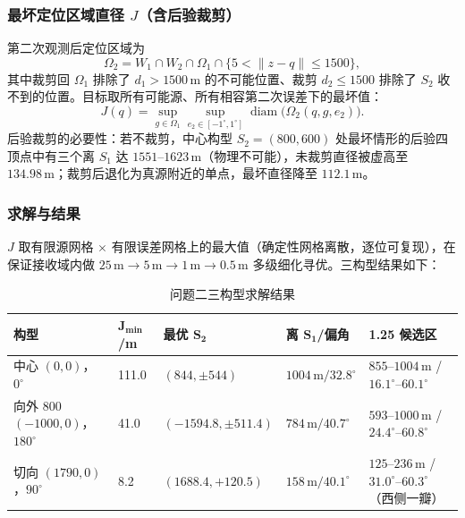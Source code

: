 \documentclass[12pt,a4paper]{article}
\begin{document}
\subsubsection{最坏定位区域直径 $J$（含后验裁剪）}
第二次观测后定位区域为
\begin{equation}
\Omega_2=W_1\cap W_2\cap\Omega_1\cap\{5<\lVert z-q\rVert\le 1500\},
\end{equation}
其中裁剪回 $\Omega_1$ 排除了 $d_1>1500\,\mathrm{m}$ 的不可能位置、裁剪 $d_2\le 1500$ 排除了 $S_2$ 收不到的位置。目标取所有可能源、所有相容第二次误差下的最坏值：
\begin{equation}
J(q)=\sup_{g\in\Omega_1}\sup_{e_2\in[-1^{\circ},1^{\circ}]}\operatorname{diam}\bigl(\Omega_2(q,g,e_2)\bigr).
\end{equation}
后验裁剪的必要性：若不裁剪，中心构型 $S_2=(800,600)$ 处最坏情形的后验四顶点中有三个离 $S_1$ 达 $1551$--$1623\,\mathrm{m}$（物理不可能），未裁剪直径被虚高至 $134.98\,\mathrm{m}$；裁剪后退化为真源附近的单点，最坏直径降至 $112.1\,\mathrm{m}$。

\subsubsection{求解与结果}
$J$ 取有限源网格 $\times$ 有限误差网格上的最大值（确定性网格离散，逐位可复现），在保证接收域内做 $25\,\mathrm{m}\to 5\,\mathrm{m}\to 1\,\mathrm{m}\to 0.5\,\mathrm{m}$ 多级细化寻优。三构型结果如下：

\begin{table}[H]
\centering
\caption{问题二三构型求解结果}
\small
\begin{tabularx}{\textwidth}{@{}L{3.15cm}L{1.35cm}L{3.15cm}L{2.55cm}Y@{}}
\toprule
\textbf{构型} & $\boldsymbol{J_{\min}}$\textbf{/m} & \textbf{最优} $\boldsymbol{S_2}$ & \textbf{离} $\boldsymbol{S_1}$\textbf{/偏角} & \textbf{1.25 候选区} \\
\midrule
中心 $(0,0)$，$0^{\circ}$
  & 111.0 & $(844,\pm 544)$ & $1004\,\mathrm{m}/32.8^{\circ}$
  & $855$--$1004\,\mathrm{m}$ / $16.1^{\circ}$--$60.1^{\circ}$ \\[0.35em]
向外 $800$ $(-1000,0)$，$180^{\circ}$
  & 41.0 & $(-1594.8,\pm 511.4)$ & $784\,\mathrm{m}/40.7^{\circ}$
  & $593$--$1000\,\mathrm{m}$ / $24.4^{\circ}$--$60.8^{\circ}$ \\[0.35em]
切向 $(1790,0)$，$90^{\circ}$
  & 8.2 & $(1688.4,+120.5)$ & $158\,\mathrm{m}/40.1^{\circ}$
  & $125$--$236\,\mathrm{m}$ / $31.0^{\circ}$--$60.3^{\circ}$（西侧一瓣） \\
\bottomrule
\end{tabularx}
\end{table}
\end{document}
